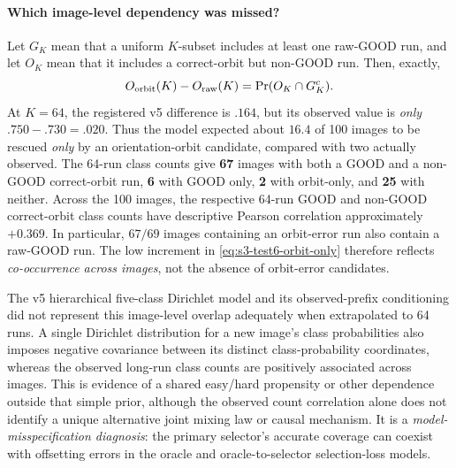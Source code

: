 \paragraph{Which image-level dependency was missed?}
Let $G_K$ mean that a uniform $K$-subset includes at
least one raw-GOOD run, and let $O_K$ mean that it includes
a correct-orbit but non-GOOD run. Then, exactly,
\begin{equation}\label{eq:s3-test6-orbit-only}
 O_{\rm orbit}(K)-O_{\rm raw}(K)
 =\Pr(O_K\cap G_K^c).
\end{equation}
At $K=64$, the registered v5 difference is
$.164$, but its observed value is \emph{only}
$.750-.730=.020$. Thus the model expected about
$16.4$ of 100 images to be rescued \emph{only} by
an orientation-orbit candidate, compared with
two actually observed. The 64-run class counts give
\textbf{67} images with both a GOOD and a non-GOOD
correct-orbit run, \textbf{6} with GOOD only,
\textbf{2} with orbit-only, and \textbf{25} with
neither. Across the 100 images, the respective
64-run GOOD and non-GOOD correct-orbit class counts
have descriptive Pearson correlation approximately
$+0.369$. In particular, $67/69$ images containing
an orbit-error run also contain a raw-GOOD run.
The low increment in
\eqref{eq:s3-test6-orbit-only} therefore reflects
\emph{co-occurrence across images}, not the absence
of orbit-error candidates.

The v5 hierarchical five-class Dirichlet model
and its observed-prefix conditioning did not
represent this image-level overlap adequately
when extrapolated to 64 runs. A single Dirichlet
distribution for a new image's class probabilities
also imposes negative covariance between its
distinct class-probability coordinates, whereas
the observed long-run class counts are positively
associated across images. This is evidence of
a shared easy/hard propensity or other dependence
outside that simple prior, although the observed
count correlation alone does not identify a unique
alternative joint mixing law or causal mechanism.
It is a \emph{model-misspecification diagnosis}:
the primary selector's accurate coverage can coexist
with offsetting errors in the oracle and
oracle-to-selector selection-loss models.

